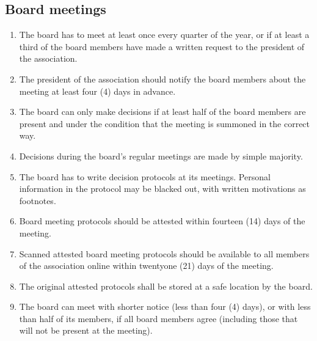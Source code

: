 \subsection{Board meetings}
\begin{enumerate}
  \item The board has to meet at least once every quarter of the year, or if at least a third of the board members have made a written request to the president of the association.
  \item The president of the association should notify the board members about the meeting at least four (4) days in advance.
  \item The board can only make decisions if at least half of the board members are present and under the condition that the meeting is summoned in the correct way.
  \item Decisions during the board's regular meetings are made by simple majority.
  \item The board has to write decision protocols at its meetings. Personal information in the protocol may be blacked out, with written motivations as footnotes.
  \item Board meeting protocols should be attested within fourteen (14) days of the meeting.
  \item Scanned attested board meeting protocols should be available to all members of the association online within twentyone (21) days of the meeting.
  \item The original attested protocols shall be stored at a safe location by the board.
  \item The board can meet with shorter notice (less than four (4) days), or with less than half of its members, if all board members agree (including those that will not be present at the meeting). 
\end{enumerate}

